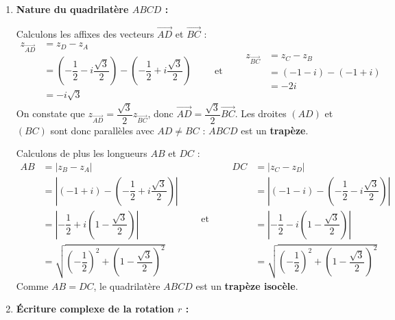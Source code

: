 \documentclass[12pt,a4paper]{article}
\begin{document}
\begin{enumerate}
    \item \textbf{Nature du quadrilatère $ABCD$ :}
    
    Calculons les affixes des vecteurs $\overrightarrow{AD}$ et $\overrightarrow{BC}$ :
    $$
    \begin{aligned}
        z_{\overrightarrow{AD}} &= z_D - z_A \\
        &= \left(-\dfrac{1}{2} - i\dfrac{\sqrt{3}}{2}\right) - \left(-\dfrac{1}{2} + i\dfrac{\sqrt{3}}{2}\right) \\
        &= -i\sqrt{3}
    \end{aligned}
    \qquad \text{et} \qquad
    \begin{aligned}
        z_{\overrightarrow{BC}} &= z_C - z_B \\
        &= (-1 - i) - (-1 + i) \\
        &= -2i
    \end{aligned}
    $$
    On constate que $z_{\overrightarrow{AD}} = \dfrac{\sqrt{3}}{2} z_{\overrightarrow{BC}}$, donc $\overrightarrow{AD} = \dfrac{\sqrt{3}}{2}\overrightarrow{BC}$. Les droites $(AD)$ et $(BC)$ sont donc parallèles avec $AD \neq BC$ : $ABCD$ est un \textbf{trapèze}.
    
    Calculons de plus les longueurs $AB$ et $DC$ :
    $$
    \begin{aligned}
        AB &= |z_B - z_A| \\
        &= \left|(-1 + i) - \left(-\dfrac{1}{2} + i\dfrac{\sqrt{3}}{2}\right)\right| \\
        &= \left|-\dfrac{1}{2} + i\left(1 - \dfrac{\sqrt{3}}{2}\right)\right| \\
        &= \sqrt{\left(-\dfrac{1}{2}\right)^2 + \left(1 - \dfrac{\sqrt{3}}{2}\right)^2}
    \end{aligned}
    \qquad \text{et} \qquad
    \begin{aligned}
        DC &= |z_C - z_D| \\
        &= \left|(-1 - i) - \left(-\dfrac{1}{2} - i\dfrac{\sqrt{3}}{2}\right)\right| \\
        &= \left|-\dfrac{1}{2} - i\left(1 - \dfrac{\sqrt{3}}{2}\right)\right| \\
        &= \sqrt{\left(-\dfrac{1}{2}\right)^2 + \left(1 - \dfrac{\sqrt{3}}{2}\right)^2}
    \end{aligned}
    $$
    Comme $AB = DC$, le quadrilatère $ABCD$ est un \textbf{trapèze isocèle}.

    \item \textbf{Écriture complexe de la rotation $r$ :}
    

\end{enumerate}
\end{document}
